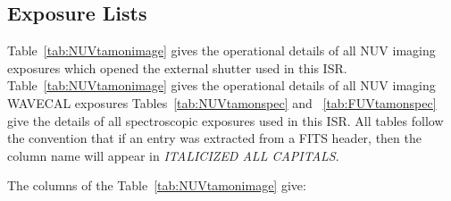 \subsection{Exposure Lists}\label{subsec:elists}

Table~\ref{tab:NUVtamonimage} gives the operational details of all NUV imaging exposures which opened the
external shutter used in this ISR. Table~\ref{tab:NUVtamonimage} gives the operational details of all NUV imaging WAVECAL
exposures
Tables~\ref{tab:NUVtamonspec} and ~\ref{tab:FUVtamonspec} give the details of all spectroscopic exposures used in this ISR.
All tables follow the convention that if an entry was extracted from a FITS header, then the column name will appear in \textit{ITALICIZED ALL CAPITALS}.

The columns of the Table~\ref{tab:NUVtamonimage} give:
\footnotesize
